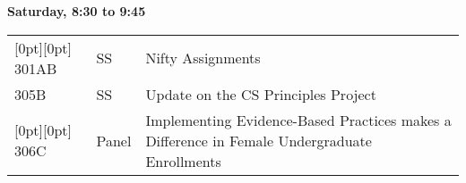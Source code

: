 










%
%
\noindent
{\sffamily\bfseries Saturday, 8:30 to 9:45}\newline\noindent
\begin{tabular*}{5in}{@{}p{0.5in}@{}p{0.75in}@{}p{3.75in}}

\rowcolor[gray]{0.9}[0pt][0pt] 301AB & SS & Nifty Assignments \\

305B & SS & Update on the CS Principles Project \\

\rowcolor[gray]{0.9}[0pt][0pt] 306C & Panel & Implementing Evidence-Based Practices makes a Difference in Female Undergraduate Enrollments \\
\end{tabular*}\newline

